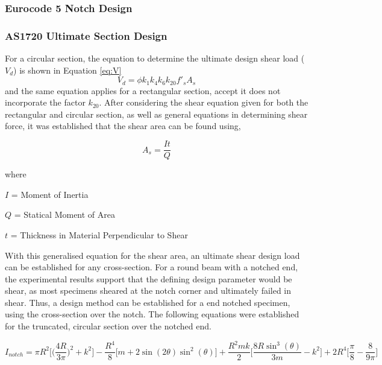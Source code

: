 \documentclass[11pt,a4paper]{article}
\numberwithin{equation}{subsection}
\begin{document}
\subsubsection{Eurocode 5 Notch Design}


\subsubsection{AS1720 Ultimate Section Design}
For a circular section, the equation to determine the ultimate design shear load ($V_{d}$) is shown in Equation \ref{eq:V}
	\begin{equation}
	V_{d} = \phi k_{1} k_{4} k_{6} k_{20} f'_{s} A_{s}
	\label{eq:V}
	\end{equation}
\noindent
and the same equation applies for a rectangular section, accept it does not incorporate the factor $k_{20}$. After considering the shear equation given for both the rectangular and circular section, as well as general equations in determining shear force, it was established that the shear area can be found using, 
	
	\begin{equation}
	A_{s} = \frac{It}{Q}
	\label{eq:As}
	\end{equation}

where \par
$ I $ = Moment of Inertia\par
$ Q $ = Statical Moment of Area \par
$ t $ = Thickness in Material Perpendicular to Shear \par

\vspace*{\baselineskip}

\noindent
With this generalised equation for the shear area, an ultimate shear design load can be established for any cross-section. For a round beam with a notched end, the experimental results support that the defining design parameter would be shear, as most specimens sheared at the notch corner and ultimately failed in shear. Thus, a design method can be established for a end notched specimen, using the cross-section over the notch. The following equations were established for the truncated, circular section over the notched end.

	\begin{equation}
	I_{notch} = \pi R^{2}\bigg[\bigg(\frac{4R}{3\pi}\bigg)^{2}+k^{2}\bigg]- \frac{R^{4}}{8}\bigg[m+2\sin(2\theta)\sin^{2}(\theta)\bigg]+\frac{R^{2}mk}{2}\bigg[\frac{8R\sin^{3}(\theta)}{3m}-k^{2}\bigg]+2R^{4}\bigg[\frac{\pi}{8}-\frac{8}{9\pi}\bigg]
	\label{eq:Itot}
	\end{equation} 
	
\end{document}
